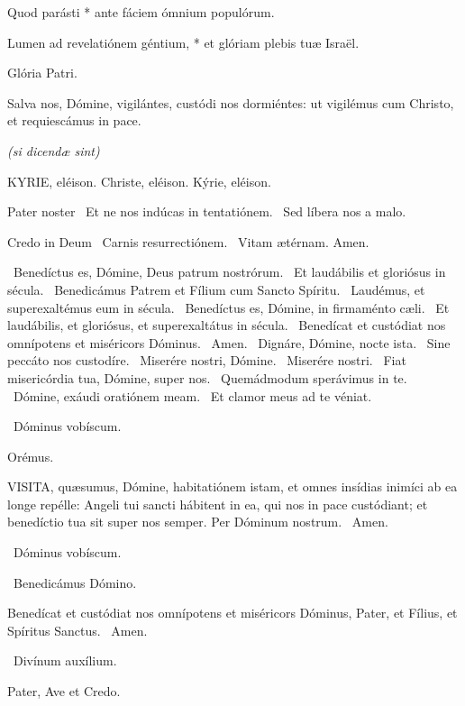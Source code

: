 Quod parásti * ante fáciem ómnium populórum.

Lumen ad revelatiónem géntium, * et glóriam plebis tuæ Israël.

Glória Patri.

 Salva nos, Dómine, vigilántes, custódi nos dormiéntes: ut vigilémus cum Christo, et requiescámus in pace.


\textit{(si dicendæ sint)}

KYRIE, eléison. Christe, eléison. Kýrie, eléison.

Pater noster  \V\ Et ne nos indúcas in tentatiónem. \R\ Sed líbera nos a malo.

Credo in Deum  \V\ Carnis resurrectiónem. \R\ Vitam ætérnam. Amen.

\V\ Benedíctus es, Dómine, Deus patrum nostrórum. \R\ Et laudábilis et gloriósus in sécula. \V\ Benedicámus Patrem et Fílium cum Sancto Spíritu. \R\ Laudémus, et superexaltémus eum in sécula. \V\ Benedíctus es, Dómine, in firmaménto cæli. \R\ Et laudábilis, et gloriósus, et superexaltátus in sécula. \V\ Benedícat et custódiat nos omnípotens et miséricors Dóminus. \R\ Amen. \V\ Dignáre, Dómine, nocte ista. \R\ Sine peccáto nos custodíre. \V\ Miserére nostri, Dómine. \R\ Miserére nostri. \V\ Fiat misericórdia tua, Dómine, super nos. \R\ Quemádmodum sperávimus in te. \V\ Dómine, exáudi oratiónem meam. \R\ Et clamor meus ad te véniat.

\sectionornament

\V\ Dóminus vobíscum.

Orémus. 

\lettrine[lines=2]{V}{ISITA}, quæsumus, Dómine, habitatiónem istam, et omnes insídias inimíci ab ea longe repélle: Angeli tui sancti hábitent in ea, qui nos in pace custódiant; et benedíctio tua sit super nos semper. Per Dóminum nostrum. \R\ Amen.

\V\ Dóminus vobíscum.

\V\ Benedicámus Dómino.

 Benedícat et custódiat nos omnípotens et miséricors Dóminus, Pater, et Fílius, et Spíritus Sanctus. \R\ Amen.


\V\ Divínum auxílium.

Pater, Ave et Credo.

\sectionornament

